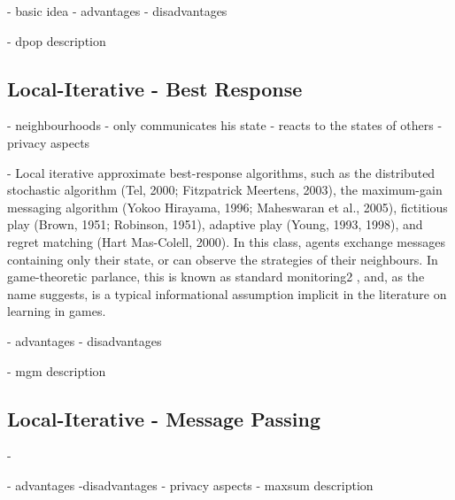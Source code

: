\cite{Chapman2011}

    - basic idea
    - advantages
    - disadvantages
    
    - dpop description

\subsection{Local-Iterative - Best Response}

- neighbourhoods
- only communicates his state
- reacts to the states of others
- privacy aspects

\cite{Chapman2011}
\cite{Maheswaran} %

    - Local iterative approximate best-response algorithms, such as the distributed stochastic algorithm
(Tel, 2000; Fitzpatrick  Meertens, 2003), the maximum-gain messaging algorithm (Yokoo 
Hirayama, 1996; Maheswaran et al., 2005), fictitious play (Brown, 1951; Robinson, 1951),
adaptive play (Young, 1993, 1998), and regret matching (Hart  Mas-Colell, 2000). In this class,
agents exchange messages containing only their state, or can observe the strategies of their
neighbours. In game-theoretic parlance, this is known as standard monitoring2
, and, as the name
suggests, is a typical informational assumption implicit in the literature on learning in games.


    - advantages
    - disadvantages
    
    - mgm description

\subsection{Local-Iterative - Message Passing}
    
    \cite{Chapman2011}
    - 
    
    - advantages
    -disadvantages
    - privacy aspects
    - maxsum description
    
    